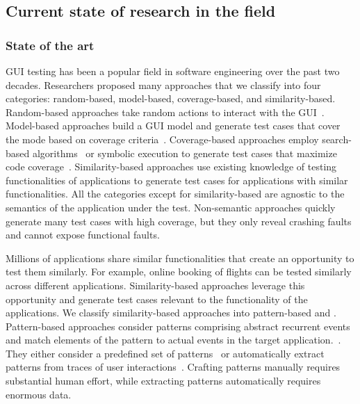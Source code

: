 \subsection{Current state of research in the field }



\subsubsection{State of the art}
GUI testing has been a popular field in software engineering over the past two decades. Researchers proposed many approaches that we classify into four categories: random-based, model-based, coverage-based, and similarity-based.
Random-based approaches take random actions to interact with the GUI~\cite{machiry:dynodroid:FSE:2013,vos:testar:ijismd:2015,ermuth:monkey:ISSTA:2016}.
Model-based approaches build a GUI model and generate test cases that cover the mode based on coverage criteria~\cite{Nguyen:GUITAR:ASEJ:2014,Li:DroidiBot:ICSE-C:2017,Gu:PractivalTest:ICSE:2019,Choi:swift:OOPSLA:2013}. 
Coverage-based approaches employ search-based algorithms~\cite{Gross:exist:ISSTA:2012,mahmood:evodroid:FSE:2014,dong:TimaMachine:ICSE:2020} or symbolic execution to generate test cases that maximize code coverage~\cite{Ganov:GUIsymbolic:FMSE:2009,cheng:guicat:ASE:2016,Anand:conc:FSE:2012}.
Similarity-based approaches use existing knowledge of testing functionalities of applications to generate test cases for applications with similar functionalities.
All the categories except for similarity-based are agnostic to the semantics of the application under the test. 
Non-semantic approaches quickly generate many test cases with high coverage, but they only reveal crashing faults and cannot expose functional faults.

\smallskip 
Millions of applications share similar functionalities that create an opportunity to test them similarly.
For example, online booking of flights can be tested similarly across different applications. 
Similarity-based approaches leverage this opportunity and generate test cases relevant to the functionality of the applications.
We classify similarity-based approaches into pattern-based and \testreuse.
Pattern-based approaches consider patterns comprising abstract recurrent events and match elements of the pattern to actual events in the target application.~\cite{Moreira:pattern:ISSRE:2013,Morgado:Impact:HCI:2019}.
They either consider a predefined set of patterns~\cite{Mariani:Augusto:ICSE:2018,Hu:appflow:FSE:2018} or automatically extract patterns from traces of user interactions~\cite{linares:mining:MSR:2015,mao:crowd:ASE:2017,Mao:UserPattern:JSS:2021}.
Crafting patterns manually requires substantial human effort, while extracting patterns automatically requires enormous data.


